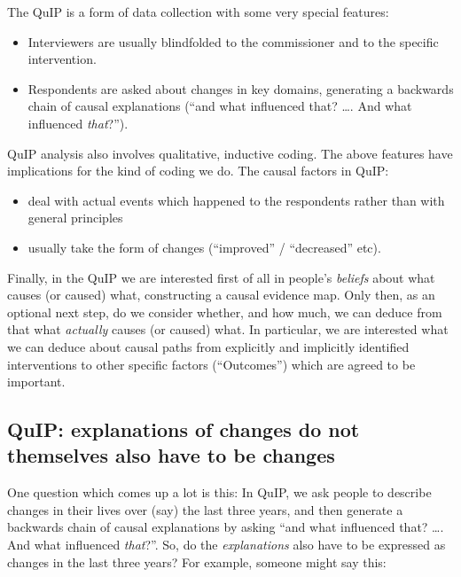 \documentclass[
]{book}
\begin{document}
The QuIP is a form of data collection with some very special features:

\begin{itemize}
\item
  Interviewers are usually blindfolded to the commissioner and to the specific intervention.
\item
  Respondents are asked about changes in key domains, generating a backwards chain of causal explanations (``and what influenced that? \ldots. And what influenced \emph{that}?'').
\end{itemize}

QuIP analysis also involves qualitative, inductive coding. The above features have implications for the kind of coding we do. The causal factors in QuIP:

\begin{itemize}
\item
  deal with actual events which happened to the respondents rather than with general principles
\item
  usually take the form of changes (``improved'' / ``decreased'' etc).
\end{itemize}

Finally, in the QuIP we are interested first of all in people's \emph{beliefs} about what causes (or caused) what, constructing a causal evidence map. Only then, as an optional next step, do we consider whether, and how much, we can deduce from that what \emph{actually} causes (or caused) what. In particular, we are interested what we can deduce about causal paths from explicitly and implicitly identified interventions to other specific factors (``Outcomes'') which are agreed to be important.

\hypertarget{quip-explanations-of-changes-do-not-themselves-also-have-to-be-changes}{%
\subsection{QuIP: explanations of changes do not themselves also have to be changes}\label{quip-explanations-of-changes-do-not-themselves-also-have-to-be-changes}}

One question which comes up a lot is this: In QuIP, we ask people to describe changes in their lives over (say) the last three years, and then generate a backwards chain of causal explanations by asking ``and what influenced that? \ldots. And what influenced \emph{that}?''. So, do the \emph{explanations} also have to be expressed as changes in the last three years? For example, someone might say this:
\end{document}
